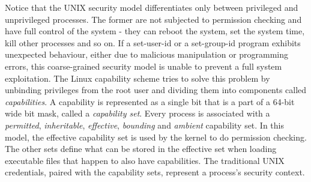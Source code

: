 Notice that the UNIX security model differentiates only between privileged and unprivileged processes.
The former are not subjected to permission checking and have full control of the system - they can 
reboot the system, set the system time, kill other processes and so on. 
If a set-user-id or a set-group-id program exhibits unexpected behaviour, either due to malicious manipulation or 
programming errors, this coarse-grained security model is unable to prevent a full system exploitation.
The Linux capability scheme tries to solve this problem by unbinding privileges from the root 
user and dividing them into components called \textit{capabilities}. A capability is represented as 
a single bit that is a part of a 64-bit wide bit mask, called a \textit{capability set}.
Every process is associated with a \textit{permitted}, \textit{inheritable}, \textit{effective}, 
\textit{bounding} and \textit{ambient} capability set. In this model, the effective capability 
set is used by the kernel to do permission checking. The other sets define what can be 
stored in the effective set when loading executable files that happen to also have capabilities. 
The traditional UNIX credentials, paired with the capability sets, represent a process's
security context. 

